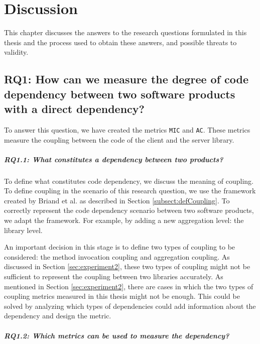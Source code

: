 \chapter{Discussion}\label{ch:Discussion}
This chapter discusses the answers to the research questions formulated in this thesis and the process used to obtain these answers, and possible threats to validity.

\section{RQ1: How can we measure the degree of code dependency between two software products with a direct dependency?}

To answer this question, we have created the metrics \texttt{MIC} and \texttt{AC}. These metrics measure the coupling between the code of the client and the server library.

\paragraph{RQ1.1: What constitutes a dependency between two products?}

To define what constitutes code dependency, we discuss the meaning of coupling. To define coupling in the scenario of this research question, we use the framework created by Briand et al. \cite{briand1999unified} as described in Section \ref{subsect:defCoupling}. To correctly represent the code dependency scenario between two software products, we adapt the framework. For example, by adding a new aggregation level: the library level.

An important decision in this stage is to define two types of coupling to be considered: the method invocation coupling and aggregation coupling. As discussed in Section \ref{sec:experiment2}, these two types of coupling might not be sufficient to represent the coupling between two libraries accurately. As mentioned in Section \ref{sec:experiment2}, there are cases in which the two types of coupling metrics measured in this thesis might not be enough. This could be solved by analyzing which types of dependencies could add information about the dependency and design the metric.

\paragraph{RQ1.2: Which metrics can be used to measure the dependency?}


